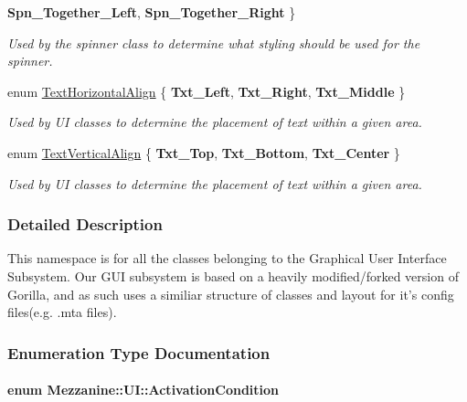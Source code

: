 \begin{DoxyCompactItemize}
{\bfseries Spn\_\-Together\_\-Left}, 
{\bfseries Spn\_\-Together\_\-Right}
 \}
\begin{DoxyCompactList}\small\item\em Used by the spinner class to determine what styling should be used for the spinner. \item\end{DoxyCompactList}\item 
enum \hyperlink{namespaceMezzanine_1_1UI_aebbd46e62bb20d958f1915c1ec6cc549}{TextHorizontalAlign} \{ {\bfseries Txt\_\-Left}, 
{\bfseries Txt\_\-Right}, 
{\bfseries Txt\_\-Middle}
 \}
\begin{DoxyCompactList}\small\item\em Used by UI classes to determine the placement of text within a given area. \item\end{DoxyCompactList}\item 
enum \hyperlink{namespaceMezzanine_1_1UI_ab35e3845e2541698245262cc17147ae9}{TextVerticalAlign} \{ {\bfseries Txt\_\-Top}, 
{\bfseries Txt\_\-Bottom}, 
{\bfseries Txt\_\-Center}
 \}
\begin{DoxyCompactList}\small\item\em Used by UI classes to determine the placement of text within a given area. \item\end{DoxyCompactList}\end{DoxyCompactItemize}


\subsubsection{Detailed Description}
This namespace is for all the classes belonging to the Graphical User Interface Subsystem. Our GUI subsystem is based on a heavily modified/forked version of Gorilla, and as such uses a similiar structure of classes and layout for it's config files(e.g. .mta files). 

\subsubsection{Enumeration Type Documentation}
\hypertarget{namespaceMezzanine_1_1UI_aca58497951b1b9c7da10f214da3392f0}{
\paragraph[{ActivationCondition}]{\setlength{\rightskip}{0pt plus 5cm}enum {\bf Mezzanine::UI::ActivationCondition}}\hfill}
\label{namespaceMezzanine_1_1UI_aca58497951b1b9c7da10f214da3392f0}


